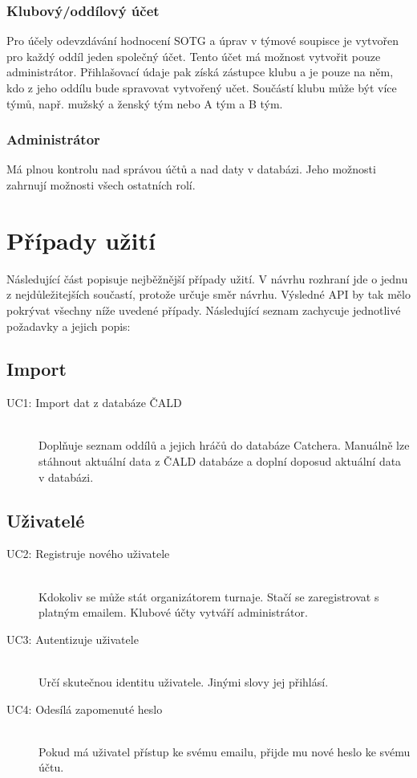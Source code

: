 \subsubsection*{Klubový/oddílový účet}

Pro účely odevzdávání hodnocení SOTG a úprav v týmové soupisce je vytvořen pro každý oddíl
jeden společný účet. Tento účet má možnost vytvořit pouze administrátor. Přihlašovací údaje pak
získá zástupce klubu a je pouze na něm, kdo z jeho oddílu bude spravovat vytvořený učet.
Součástí klubu může být více týmů, např. mužský a ženský tým nebo A tým a B tým.
  
\subsubsection*{Administrátor}
Má plnou kontrolu nad správou účtů a nad daty v databázi. Jeho možnosti zahrnují možnosti
všech ostatních rolí.

\section{Případy užití}
\label{sec:use_case}

Následující část popisuje nejběžnější případy užití. V návrhu rozhraní jde
o jednu z nejdůležitejších součastí, protože určuje směr návrhu. Výsledné API by tak mělo
pokrývat všechny níže uvedené případy. Následující seznam zachycuje jednotlivé požadavky
a jejich popis:

  \subsection*{Import}
    \begin{description}
      \item[UC1: Import dat z databáze ČALD] \hfill \\
      Doplňuje seznam oddílů a jejich hráčů do databáze Catchera. Manuálně lze stáhnout
      aktuální data z ČALD databáze a doplní doposud aktuální data v databázi.
    \end{description}
  
  \subsection*{Uživatelé}
    \begin{description}
      \item[UC2: Registruje nového uživatele] \hfill \\
      Kdokoliv se může stát organizátorem turnaje. Stačí se zaregistrovat s platným emailem.
      Klubové účty vytváří administrátor.
      \item[UC3: Autentizuje uživatele] \hfill \\
      Určí skutečnou identitu uživatele. Jinými slovy jej přihlásí.
      \item[UC4: Odesílá zapomenuté heslo] \hfill \\
      Pokud má uživatel přístup ke svému emailu, přijde mu nové heslo ke svému účtu.
    \end{description}
  
